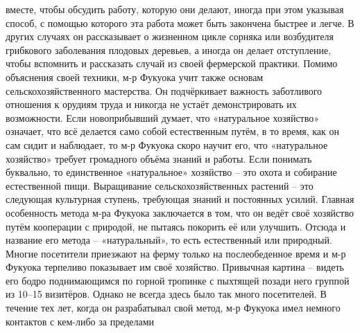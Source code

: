 \documentclass[a4paper]{book}
\begin{document}
вместе, чтобы обсудить работу, которую они делают, иногда при этом указывая способ, с
помощью которого эта работа может быть закончена быстрее и легче. В других случаях он
рассказывает о жизненном цикле сорняка или возбудителя грибкового заболевания плодовых
деревьев, а иногда он делает отступление, чтобы вспомнить и рассказать случай из своей
фермерской практики. Помимо объяснения своей техники, м-р Фукуока учит также основам
сельскохозяйственного мастерства. Он подчёркивает важность заботливого отношения к
орудиям труда и никогда не устаёт демонстрировать их возможности.
Если новоприбывший думает, что «натуральное хозяйство» означает, что всё делается
само собой естественным путём, в то время, как он сам сидит и наблюдает, то м-р Фукуока
скоро научит его, что «натуральное хозяйство» требует громадного объёма знаний и работы.
Если понимать буквально, то единственное «натуральное» хозяйство – это охота и собирание
естественной пищи. Выращивание сельскохозяйственных растений – это следующая
культурная ступень, требующая знаний и постоянных усилий. Главная особенность метода
м-ра Фукуока заключается в том, что он ведёт своё хозяйство путём кооперации с природой,
не пытаясь покорить её или улучшить. Отсюда и название его метода – «натуральный», то
есть естественный или природный.
Многие посетители приезжают на ферму только на послеобеденное время и м-р
Фукуока терпеливо показывает им своё хозяйство. Привычная картина – видеть его бодро
поднимающимся по горной тропинке с пыхтящей позади него группой из 10–15 визитёров.
Однако не всегда здесь было так много посетителей. В течение тех лет, когда он
разрабатывал свой метод, м-р Фукуока имел немного контактов с кем-либо за пределами
\end{document}

